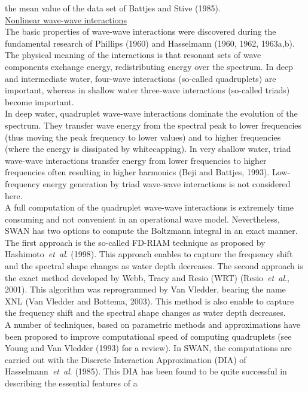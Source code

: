 \documentclass[12pt]{book}
\begin{document}
the mean value of the data set of Battjes and Stive (1985).
\nocite{Bat78J,Tho83G,Bat92B,Vin94SD,Arc94RC,Eld96B,Eld95B,Mas92K,Elg97GRHG,Che97G,Bat85S}
\\[2ex]
\noindent
\underline{Nonlinear wave-wave interactions}\\[2ex]
The basic properties of wave-wave interactions were discovered during the fundamental research
of Phillips (1960) and Hasselmann (1960, 1962, 1963a,b). The physical meaning of the interactions is that
resonant sets of wave components exchange energy, redistributing energy over the spectrum. In deep
and intermediate water, four-wave interactions (so-called quadruplets) are important, whereas
in shallow water three-wave interactions (so-called triads) become important.
\\[2ex]
\noindent
In deep water, quadruplet wave-wave interactions dominate the evolution of the spectrum. They transfer
wave energy from the spectral peak to lower frequencies (thus moving the peak frequency to lower values)
and to higher frequencies (where the energy is dissipated by whitecapping). In very shallow water, triad
wave-wave interactions transfer energy from lower frequencies to higher frequencies often resulting in
higher harmonics (Beji and Battjes, 1993). Low-frequency energy generation by triad wave-wave
interactions is not considered here.
\\[2ex]
\noindent
A full computation of the quadruplet wave-wave interactions is extremely time consuming and not
convenient in an operational wave model. Nevertheless, SWAN has two options to compute the Boltzmann integral
in an exact manner. The first approach is the so-called FD-RIAM technique as proposed by Hashimoto~{\it et~al}.
(1998). This approach enables to capture the frequency shift and the spectral shape changes as water depth
decreases. The second approach is the exact method developed by Webb, Tracy and Resio (WRT)
(Resio~{\it et~al}., 2001). This algorithm was reprogrammed by Van Vledder, bearing the name XNL
(Van Vledder and Bottema, 2003). This method is also enable to capture the frequency shift and the spectral
shape changes as water depth decreases.
\\[2ex]
\noindent
A number of techniques, based on parametric methods and approximations have been proposed to
improve computational speed of computing quadruplets (see Young and Van Vledder (1993) for a review). In SWAN,
the computations are carried out with the Discrete Interaction Approximation (DIA) of Hasselmann~{\it et~al}.
(1985). This DIA has been found to be quite successful in describing the essential features of a
\end{document}

